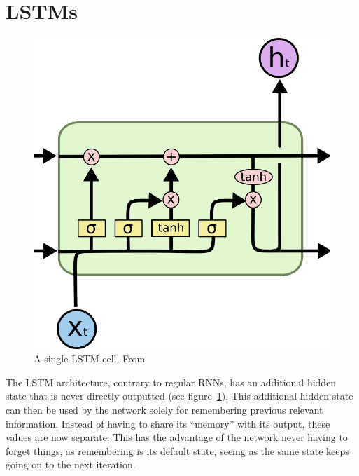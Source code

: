 \section{LSTMs}

\begin{figure}
	\begin{center}
		\includegraphics[scale=0.5]{rnn/lstm_cell}
	\end{center}
	\caption{A single LSTM cell. From~\cite{olah2015understanding}\label{fig:lstm_cell}}
\end{figure}

The LSTM architecture, contrary to regular RNNs, has an additional hidden state that is never directly outputted (see figure~\ref{fig:lstm_cell}). This additional hidden state can then be used by the network solely for remembering previous relevant information. Instead of having to share its \enquote{memory} with its output, these values are now separate. This has the advantage of the network never having to forget things, as remembering is its default state, seeing as the same state keeps going on to the next iteration.


